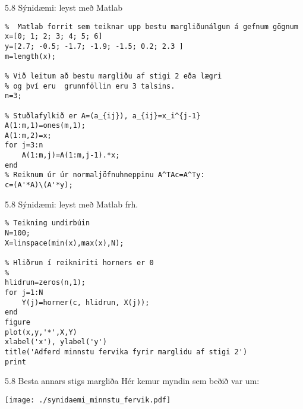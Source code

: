 \begin{frame}[fragile]{5.8 Sýnidæmi:  leyst með Matlab}
\begin{verbatim}
%  Matlab forrit sem teiknar upp bestu margliðunálgun á gefnum gögnum
x=[0; 1; 2; 3; 4; 5; 6] 
y=[2.7; -0.5; -1.7; -1.9; -1.5; 0.2; 2.3 ] 
m=length(x); 

% Við leitum að bestu margliðu af stigi 2 eða lægri 
% og því eru  grunnföllin eru 3 talsins. 
n=3; 

% Stuðlafylkið er A=(a_{ij}), a_{ij}=x_i^{j-1}  
A(1:m,1)=ones(m,1); 
A(1:m,2)=x; 
for j=3:n 
    A(1:m,j)=A(1:m,j-1).*x; 
end  
% Reiknum úr úr normaljöfnuhneppinu A^TAc=A^Ty:  
c=(A'*A)\(A'*y); 
\end{verbatim}
\end{frame}

\begin{frame}[fragile]{5.8 Sýnidæmi:  leyst með Matlab frh.}
\begin{verbatim}
% Teikning undirbúin 
N=100;   
X=linspace(min(x),max(x),N); 

% Hliðrun í reikniriti horners er 0 
% 
hlidrun=zeros(n,1); 
for j=1:N 
    Y(j)=horner(c, hlidrun, X(j)); 
end 
figure 
plot(x,y,'*',X,Y) 
xlabel('x'), ylabel('y') 
title('Adferd minnstu fervika fyrir marglidu af stigi 2') 
print 
\end{verbatim}
\end{frame}

\begin{frame}{5.8 Besta annars stigs margliða} 
Hér kemur myndin sem beðið var um:
\begin{center}
 \texttt{[image: ./synidaemi\_minnstu\_fervik.pdf]}
 \end{center}
\end{frame}

